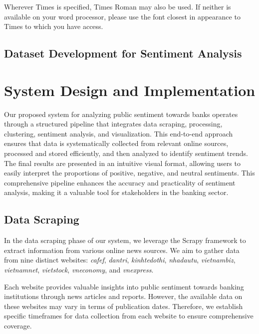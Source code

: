 {Wherever Times is specified, Times Roman may also be used. If neither is available on your word processor, please use the font closest in appearance to Times to which you have access.

\subsection{Dataset Development for Sentiment Analysis}

\section{System Design and Implementation}

Our proposed system for analyzing public sentiment towards banks operates through a structured pipeline that integrates data scraping, processing, clustering, sentiment analysis, and visualization. This end-to-end approach ensures that data is systematically collected from relevant online sources, processed and stored efficiently, and then analyzed to identify sentiment trends. The final results are presented in an intuitive visual format, allowing users to easily interpret the proportions of positive, negative, and neutral sentiments. This comprehensive pipeline enhances the accuracy and practicality of sentiment analysis, making it a valuable tool for stakeholders in the banking sector.

\subsection{Data Scraping}
In the data scraping phase of our system, we leverage the Scrapy framework\cite{kouzis2016learning} to extract information from various online news sources. We aim to gather data from nine distinct websites: \textit{cafef}, \textit{dantri}, \textit{kinhtedothi}, \textit{nhadautu}, \textit{vietnambiz}, \textit{vietnamnet}, \textit{vietstock}, \textit{vneconomy}, and \textit{vnexpress}.

Each website provides valuable insights into public sentiment towards banking institutions through news articles and reports. However, the available data on these websites may vary in terms of publication dates. Therefore, we establish specific timeframes for data collection from each website to ensure comprehensive coverage.

}
